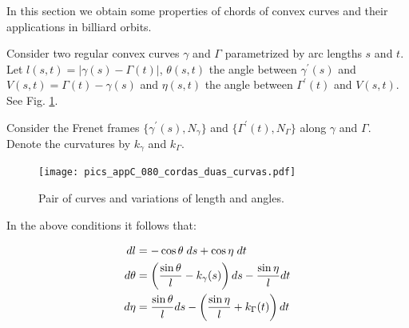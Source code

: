 

In this section we obtain some  properties of chords of convex curves and their applications in billiard orbits.
 
Consider two regular convex curves $\gamma$ and $\Gamma$ parametrized by arc lengths $s$ and $t$. 
Let $l(s,t)=|\gamma(s)-\Gamma(t)|$, $\theta(s,t) $ the angle between $\gamma^\prime(s)$ and $V(s,t)=\Gamma(t)-\gamma(s)$ and  $\eta(s,t) $ the angle between $\Gamma^\prime(t)$ and $V(s,t)$. See Fig. \ref{fig:appC-1corda}.

Consider the Frenet frames $\{\gamma^\prime (s), N_\gamma\}$ and $\{\Gamma^\prime (t), N_\Gamma\}$ along $\gamma$ and $\Gamma$.  Denote the curvatures by $k_\gamma$ and 
$k_\Gamma$.

\begin{figure}[H]
	\begin{center}
		 \texttt{[image:  pics\_appC\_080\_cordas\_duas\_curvas.pdf]}
		\caption {Pair of curves and variations of length and angles.\label{fig:appC-1corda}}
	\end{center}
\end{figure}

\begin{proposition}  In the above conditions it follows that:


	\begin{equation}
\aligned
dl&= -\cos\theta\;   ds + \cos\eta\;   dt\\
d\theta &=\left( \frac{\sin\theta }{l }-k_{ \gamma}(s)\right) ds -\frac{\sin\eta}{l } dt\\
d\eta &=  \frac{\sin\theta }{l } ds  - \left(  \frac{\sin\eta}{l } + k_{\Gamma }(t)\right)  dt
\endaligned
\label{eqn:appC-variacaoL}
\end{equation}
\label{prop:appC-variacaoL}
\end{proposition}

